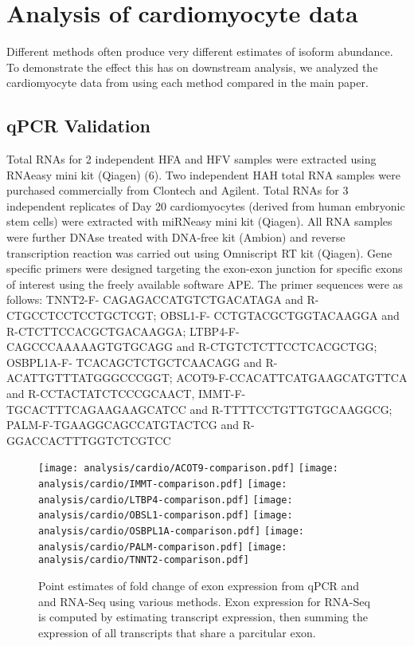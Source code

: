 \documentclass{article}
\begin{document}
\section{Analysis of cardiomyocyte data}

Different methods often produce very different estimates of isoform abundance.
To demonstrate the effect this has on downstream analysis, we analyzed the
cardiomyocyte data from \cite{Kuppusamy:2015ey} using each method compared in
the main paper.

\subsection{qPCR Validation}

Total RNAs for 2 independent HFA and HFV samples were extracted using RNAeasy
mini kit (Qiagen) (6). Two independent HAH total RNA samples were purchased
commercially from Clontech and Agilent. Total RNAs for 3 independent replicates
of Day 20 cardiomyocytes (derived from human embryonic stem cells) were
extracted with miRNeasy mini kit (Qiagen). All RNA samples were further DNAse
treated with DNA-free kit (Ambion) and reverse transcription reaction was
carried out using Omniscript RT kit (Qiagen). Gene specific primers were
designed targeting the exon-exon junction for specific exons of interest using
the freely available software APE. The primer sequences were as follows:
TNNT2-F- CAGAGACCATGTCTGACATAGA and R-CTGCCTCCTCCTGCTCGT; OBSL1-F-
CCTGTACGCTGGTACAAGGA and R-CTCTTCCACGCTGACAAGGA; LTBP4-F- CAGCCCAAAAAGTGTGCAGG
and R-CTGTCTCTTCCTCACGCTGG; OSBPL1A-F- TCACAGCTCTGCTCAACAGG and
R-ACATTGTTTATGGGCCCGGT; ACOT9-F-CCACATTCATGAAGCATGTTCA and
R-CCTACTATCTCCCGCAACT, IMMT-F-TGCACTTTCAGAAGAAGCATCC and R-TTTTCCTGTTGTGCAAGGCG;
PALM-F-TGAAGGCAGCCATGTACTCG and R-GGACCACTTTGGTCTCGTCC

\begin{figure}
\texttt{[image: analysis/cardio/ACOT9-comparison.pdf]}
\texttt{[image: analysis/cardio/IMMT-comparison.pdf]}
\texttt{[image: analysis/cardio/LTBP4-comparison.pdf]}
\texttt{[image: analysis/cardio/OBSL1-comparison.pdf]}
\texttt{[image: analysis/cardio/OSBPL1A-comparison.pdf]}
\texttt{[image: analysis/cardio/PALM-comparison.pdf]}
\texttt{[image: analysis/cardio/TNNT2-comparison.pdf]}
\caption{Point estimates of fold change of exon expression from qPCR and and
RNA-Seq using various methods. Exon expression for RNA-Seq is computed by
estimating transcript expression, then summing the expression of all transcripts
that share a parcitular exon.}
\end{figure}
\end{document}
